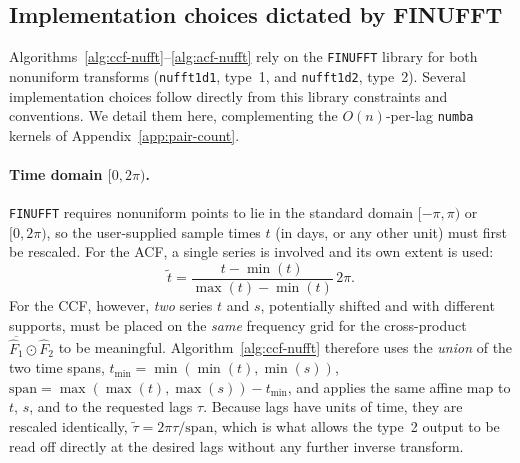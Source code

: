 \documentclass[twocolumn,10pt]{article}
\begin{document}
\subsection{Implementation choices dictated by FINUFFT}
\label{app:finufft-notes}
%
Algorithms~\ref{alg:ccf-nufft}--\ref{alg:acf-nufft} rely on the
\texttt{FINUFFT} library for both nonuniform transforms (\texttt{nufft1d1},
type~1, and \texttt{nufft1d2}, type~2). Several implementation choices
follow directly from this library  constraints and conventions. We
detail them here, complementing the $O(n)$-per-lag \texttt{numba}
kernels of Appendix~\ref{app:pair-count}.
%
\paragraph{\bf Time domain $[0,2\pi)$.}
\texttt{FINUFFT} requires nonuniform points to lie in the standard
domain $[-\pi,\pi)$ or $[0,2\pi)$, so the user-supplied sample times
$t$ (in days, or any other unit) must first be rescaled. For the ACF, a
single series is involved and its own extent is used:
$$\tilde t = \frac{t-\min(t)}{\max(t)-\min(t)}\,2\pi.$$ 
For the CCF, however,
\emph{two} series $t$ and $s$, potentially shifted and with different
supports, must be placed on the \emph{same} frequency grid for the
cross-product $\overline{\hat F_1}\odot\hat F_2$ to be meaningful.
Algorithm~\ref{alg:ccf-nufft} therefore uses the \emph{union} of the
two time spans, $t_{\min}=\min(\min(t),\min(s))$,
$\mathrm{span}=\max(\max(t),\max(s))-t_{\min}$, and applies the same
affine map to $t$, $s$, and to the requested lags $\tau$. Because lags
have units of time, they are rescaled identically,
$\tilde\tau=2\pi\tau/\mathrm{span}$, which is what allows the
type~2 output to be read off directly at the desired lags without any
further inverse transform.
%
\end{document}
